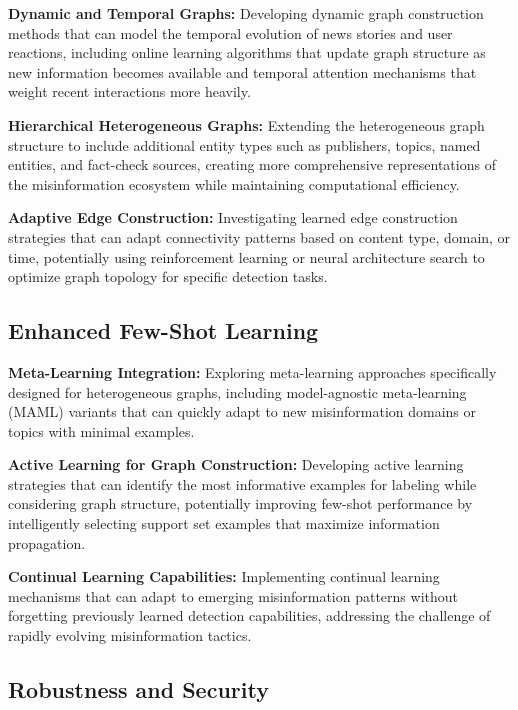 \textbf{Dynamic and Temporal Graphs:} Developing dynamic graph construction methods that can model the temporal evolution of news stories and user reactions, including online learning algorithms that update graph structure as new information becomes available and temporal attention mechanisms that weight recent interactions more heavily.

\textbf{Hierarchical Heterogeneous Graphs:} Extending the heterogeneous graph structure to include additional entity types such as publishers, topics, named entities, and fact-check sources, creating more comprehensive representations of the misinformation ecosystem while maintaining computational efficiency.


\textbf{Adaptive Edge Construction:} Investigating learned edge construction strategies that can adapt connectivity patterns based on content type, domain, or time, potentially using reinforcement learning or neural architecture search to optimize graph topology for specific detection tasks.

\subsection{Enhanced Few-Shot Learning}

\textbf{Meta-Learning Integration:} Exploring meta-learning approaches specifically designed for heterogeneous graphs, including model-agnostic meta-learning (MAML) variants that can quickly adapt to new misinformation domains or topics with minimal examples.

\textbf{Active Learning for Graph Construction:} Developing active learning strategies that can identify the most informative examples for labeling while considering graph structure, potentially improving few-shot performance by intelligently selecting support set examples that maximize information propagation.

\textbf{Continual Learning Capabilities:} Implementing continual learning mechanisms that can adapt to emerging misinformation patterns without forgetting previously learned detection capabilities, addressing the challenge of rapidly evolving misinformation tactics.

\subsection{Robustness and Security}

